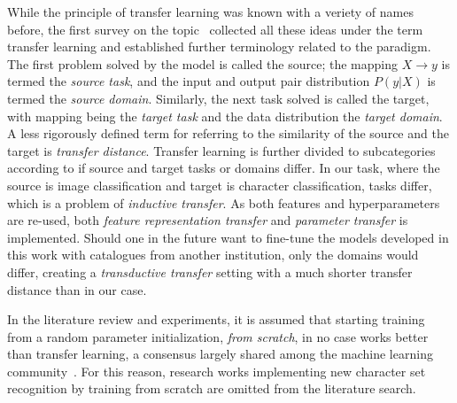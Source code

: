 \documentclass[english,twoside,openright]{UH_DS_MSc}
\begin{document}
While the principle of transfer learning was known with a veriety of names before, the first survey on  the topic~\cite{transferlearning_survey} collected all these ideas under the term transfer learning and established further terminology related to the paradigm. The first problem solved by the model is called the source;
the mapping $X\to y$ is termed the \textit{source task}, and the input and output pair distribution $P(y|X)$ is termed the \textit{source domain}.
Similarly, the next task solved is called the target, with mapping being the \textit{target task} and the data distribution the \textit{target domain}.
A less rigorously defined term for referring to the similarity of the source and the target is \textit{transfer distance}. Transfer learning is further divided to subcategories according to if source and target tasks or domains differ. In our task, where the source is image classification and target is character classification, tasks differ, which is a problem of \textit{inductive transfer}.
As both features and hyperparameters are re-used, both \textit{feature representation transfer} and \textit{parameter transfer} is implemented. Should one in the future want to fine-tune the models 
developed in this work with catalogues from another institution, only the domains would differ, creating a \textit{transductive transfer} setting with a much shorter transfer distance than in our case.

In the literature review and experiments, it is assumed that starting training from a random parameter initialization, \textit{from scratch}, in no case works 
better than transfer learning, a consensus largely shared among the machine learning community~\cite{cs231n_transfer_learning}.
For this reason, research works implementing new character set recognition by training from scratch are omitted from the literature search.
\end{document}
